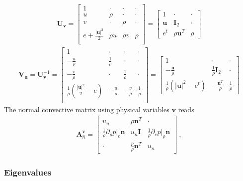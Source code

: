 \documentclass[letterpaper,10pt,english]{jupyterBook}
\begin{document}
\begin{equation*}
\begin{split}
\mathbf{U}_{\mathbf{v}} = 
\begin{bmatrix}
  1 & \cdot & \cdot & \cdot \\
  u & \rho  & \cdot & \cdot \\
  v & \cdot & \rho  & \cdot \\
  e + \frac{|\mathbf{u}|^2}{2} & \rho u & \rho v & \rho \\
\end{bmatrix}
= 
\begin{bmatrix}
 1 & \cdot & \cdot \\ 
 \mathbf{u} & \mathbf{I}_2 & \cdot \\
 e^t & \rho \mathbf{u}^T & \rho
\end{bmatrix}
\end{split}
\end{equation*}\begin{equation*}
\begin{split}
\mathbf{V}_{\mathbf{u}} = 
\mathbf{U}_{\mathbf{v}}^{-1} = 
\begin{bmatrix}
  1 & \cdot & \cdot & \cdot \\
  -\frac{u}{\rho} & \frac{1}{\rho}  & \cdot & \cdot \\
  -\frac{v}{\rho} & \cdot & \frac{1}{\rho}  & \cdot \\
  \frac{1}{\rho} \left( \frac{|\mathbf{u}|^2}{2} - e \right) & -\frac{ u}{\rho} & -\frac{ v}{\rho} & \frac{1}{\rho} \\
\end{bmatrix} 
=
\begin{bmatrix}
  1 & \cdot & \cdot \\
  - \frac{\mathbf{u}}{\rho} & \frac{1}{\rho} \mathbf{I}_2 & \cdot \\
  \frac{1}{\rho} \left( |\mathbf{u}|^2 - e^t \right) & - \frac{\mathbf{u}^T}{\rho} & \frac{1}{\rho}
\end{bmatrix} 
\end{split}
\end{equation*}
\sphinxAtStartPar
{} The normal convective matrix using physical variables \(\mathbf{v}\) reads
\begin{equation*}
\begin{split}\mathbf{A}_{\hat{n}}^{\mathbf{v}} = \begin{bmatrix} u_n & \rho \mathbf{n}^T & \cdot \\ \frac{1}{\rho}\partial_\rho p|_e \mathbf{n} & u_n \mathbf{I} & \frac{1}{\rho}\partial_e p|_{\rho} \mathbf{n} \\ \cdot & \frac{p}{\rho} \mathbf{n}^T & u_n \end{bmatrix} \ ,\end{split}
\end{equation*}\subsubsection*{Eigenvalues}
\end{document}
